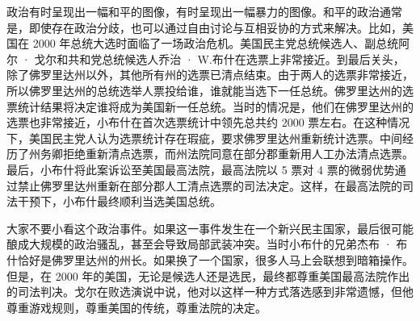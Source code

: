 





政治有时呈现出一幅和平的图像，有时呈现出一幅暴力的图像。和平的政治通常是，即使存在政治分歧，也可以通过自由讨论与互相妥协的方式来解决。比如，美国在 2000 年总统大选时面临了一场政治危机。美国民主党总统候选人、副总统阿尔 · 戈尔和共和党总统候选人乔治 · W.布什在选票上非常接近。到最后关头，除了佛罗里达州以外，其他所有州的选票已清点结束。由于两人的选票非常接近，所以佛罗里达州的总统选举人票投给谁，谁就能当选下一任总统。佛罗里达州的选票统计结果将决定谁将成为美国新一任总统。当时的情况是，他们在佛罗里达州的选票也非常接近，小布什在首次选票统计中领先总共约 2000 票左右。在这种情况下，美国民主党人认为选票统计存在瑕疵，要求佛罗里达州重新统计选票。中间经历了州务卿拒绝重新清点选票，而州法院同意在部分郡重新用人工办法清点选票。最后，小布什将此案诉讼至美国最高法院，最高法院以 5 票对 4 票的微弱优势通过禁止佛罗里达州重新在部分郡人工清点选票的司法决定。这样，在最高法院的司法干预下，小布什最终顺利当选美国总统。

大家不要小看这个政治事件。如果这一事件发生在一个新兴民主国家，最后很可能酿成大规模的政治骚乱，甚至会导致局部武装冲突。当时小布什的兄弟杰布 · 布什恰好是佛罗里达州的州长。如果换了一个国家，很多人马上会联想到暗箱操作。但是，在 2000 年的美国，无论是候选人还是选民，最终都尊重美国最高法院作出的司法判决。戈尔在败选演说中说，他对以这样一种方式落选感到非常遗憾，但他尊重游戏规则，尊重美国的传统，尊重法院的决定。

